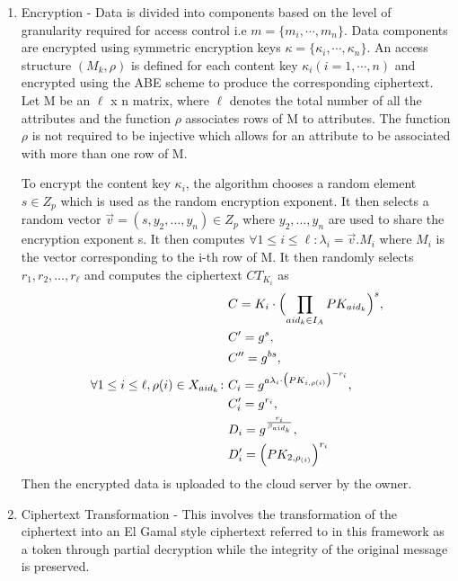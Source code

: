 \begin{enumerate}
	\item Encryption - Data is divided into components based on the level of granularity required for access control i.e $ m = \{m_{i}, \cdots, m_{n}\} $. Data components are encrypted using symmetric encryption keys $ \kappa = \{\kappa_{i}, \cdots, \kappa_{n}\} $. An access structure $ (M_{k}, \rho) $ is defined for each content key $ \kappa_{i} (i = 1, \cdots, n) $ and encrypted using the ABE scheme to produce the corresponding ciphertext. Let M be an $\ell$ x n matrix, where $\ell$ denotes the total number of all the attributes and the function $ \rho $ associates rows of M to attributes. The function $\rho$ is not required to be injective which allows for an attribute to be associated with more than one row of M.
	
	To encrypt the content key $\kappa_{i}$, the algorithm chooses a random element $ s \in Z_{p} $ which is used as the random encryption exponent. It then selects a random vector $ \vec{v} = (s, y_{2},\ldots,y_{n}) \in Z_{p} $ where $ y_{2},\ldots,y_{n} $ are used to share the encryption exponent s. It then computes $ \forall 1 \leq i \leq \ell: \lambda_{i} = \vec{v}.M_{i} $ where $ M_{i} $ is the vector corresponding to the i-th row of M. It then randomly selects $ r_{1},r_{2},\ldots,r_{\ell} $ and computes the ciphertext $CT_{K_{i}}$ as	
	\begin{align}
	\begin{split}
	&C = K_{i}\cdot\Bigl(\prod\limits_{aid_{k} \in I_{A}}PK_{aid_{k}}\Bigl)^{s}, \\ &C' = g^{s}, \\ &C'' = g^{bs},\\
	\forall 1 \leq i \leq \ell, \rho(i) \in X_{aid_{k}} \colon &C_{i} = g^{a\lambda_{i}\cdot\bigl(PK_{i,\rho(i)}\bigl)^{-r_{i}}},\\ &C'_{i} = g^{r_{i}}, \\ &D_{i} = g^{\frac{r_{i}}{\beta_{aid_k}}}, \\ &D'_{i} = \Bigl(PK_{2,\rho_{(i)}}\Bigl)^{r_{i}}
	\end{split}
	\end{align}
	Then the encrypted data is uploaded to the cloud server by the owner.
	
	\item Ciphertext Transformation - This involves the transformation of the ciphertext into an El Gamal style ciphertext referred to in this framework as a token through partial decryption while the integrity of the original message is preserved.
	

\end{enumerate}
